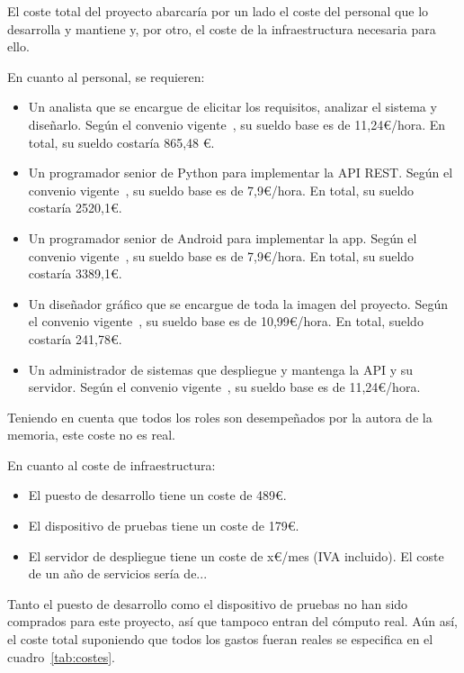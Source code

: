 El coste total del proyecto abarcaría por un lado el coste del personal que
lo desarrolla y mantiene y, por otro, el coste de la infraestructura necesaria
para ello.

En cuanto al personal, se requieren:
\begin{itemize}
\item Un analista que se encargue de elicitar los requisitos, analizar el
  sistema y diseñarlo. Según el convenio vigente~\cite{convenio}, su sueldo base
  es de 11,24€/hora. En total, su sueldo costaría 865,48 €.
\item Un programador senior de Python para implementar la API REST. Según el
  convenio vigente~\cite{convenio}, su sueldo base es de 7,9€/hora. En total, su
  sueldo costaría 2520,1€.
\item Un programador senior de Android para implementar la app. Según el
  convenio vigente~\cite{convenio}, su sueldo base es de 7,9€/hora. En total, su
  sueldo costaría 3389,1€.
\item Un diseñador gráfico que se encargue de toda la imagen del proyecto. Según
  el convenio vigente~\cite{convenio}, su sueldo base es de 10,99€/hora. En
  total, sueldo costaría 241,78€.
\item Un administrador de sistemas que despliegue y mantenga la API y su
  servidor. Según el convenio vigente~\cite{convenio}, su sueldo base es de
  11,24€/hora. 
\end{itemize}

Teniendo en cuenta que todos los roles son desempeñados por la autora de la
memoria, este coste no es real.

En cuanto al coste de infraestructura:
\begin{itemize}
\item El puesto de desarrollo tiene un coste de 489€.
\item El dispositivo de pruebas tiene un coste de 179€.
\item El servidor de despliegue tiene un coste de x€/mes (IVA incluido). El coste
  de un año de servicios sería de...
\end{itemize}

Tanto el puesto de desarrollo como el dispositivo de pruebas no han sido
comprados para este proyecto, así que tampoco entran del cómputo real. Aún así,
el coste total suponiendo que todos los gastos fueran reales se especifica en
el cuadro~\ref{tab:costes}.

